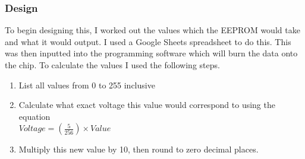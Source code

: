 \subsubsection{Design}
To begin designing this, I worked out the values which the EEPROM would take and what it would output. I used a Google Sheets spreadsheet to do this. This was then inputted into the programming software which will burn the data onto the chip. 
To calculate the values I used the following steps.
\begin{enumerate}
    \item List all values from 0 to 255 inclusive
    \item Calculate what exact voltage this value would correspond to using the equation \\$\displaystyle Voltage=\left(\frac{5}{256}\right)\times Value$
    \item Multiply this new value by 10, then round to zero decimal places.
\end{enumerate}
